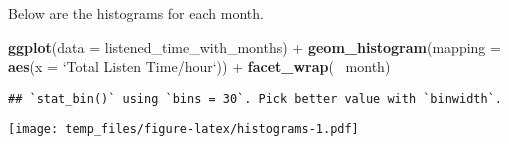 \documentclass[]{article}
\newenvironment{Shaded}{\begin{snugshade}}{\end{snugshade}}
\newcommand{\KeywordTok}[1]{\textcolor[rgb]{0.13,0.29,0.53}{\textbf{{#1}}}}
\newcommand{\DataTypeTok}[1]{\textcolor[rgb]{0.13,0.29,0.53}{{#1}}}
\newcommand{\StringTok}[1]{\textcolor[rgb]{0.31,0.60,0.02}{{#1}}}
\newcommand{\NormalTok}[1]{{#1}}
\begin{document}
Below are the histograms for each month.

\begin{Shaded}
\begin{Highlighting}[]
\KeywordTok{ggplot}\NormalTok{(}\DataTypeTok{data =} \NormalTok{listened_time_with_months) +}\StringTok{ }\KeywordTok{geom_histogram}\NormalTok{(}\DataTypeTok{mapping =} \KeywordTok{aes}\NormalTok{(}\DataTypeTok{x =} \StringTok{`}\DataTypeTok{Total Listen Time/hour}\StringTok{`}\NormalTok{)) +}\StringTok{ }\KeywordTok{facet_wrap}\NormalTok{(~}\StringTok{ }\NormalTok{month)}
\end{Highlighting}
\end{Shaded}

\begin{verbatim}
## `stat_bin()` using `bins = 30`. Pick better value with `binwidth`.
\end{verbatim}

\texttt{[image: temp\_files/figure-latex/histograms-1.pdf]}
\end{document}
